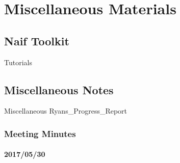 \documentclass[crop=false,class=book]{standalone}
\begin{document}
\chapter{Miscellaneous Materials}
    \section{Naif Toolkit}
        {Tutorials}
    \section{Miscellaneous Notes}
        {Miscellaneous}
        {Ryans_Progress_Report}
    \subsection{Meeting Minutes}
        \subsubsection{2017/05/30}
\end{document}
